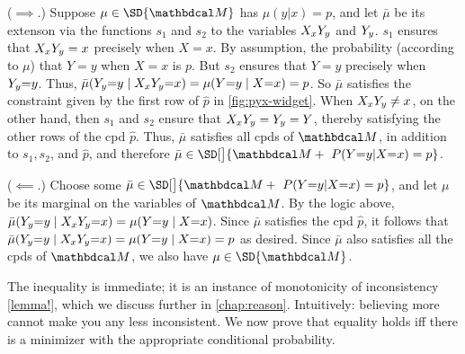 \begin{subappendices}
\begin{lproof}\label{proof:individual-prob-1}
    ($\implies$.)
    Suppose $\mu \in \SD{\dg M}$ has $\mu(y|x) = p$, and let $\bar\mu$ be its extenson via the functions $s_1$ and $s_2$ to the variables ${X_x Y_y}$ and ${Y_y}$. 
    $s_1$ ensures that ${X_x Y_y} = x$ precisely when $X = x$. 
    By assumption, the probability (according to $\mu$) that $Y{=}y$
    when $X{=}x$ is $p$. But $s_2$ ensures that $Y{=}y$ precisely when ${Y_y}{=}y$. 
    Thus,
    $\bar\mu({Y_y} {=} y \mid {X_x Y_y} {=} x) = \mu(Y{=}y \mid X{=}x) = p$.
    So $\bar \mu$ satisfies the constraint given by the first row of $\hat p$
        in \cref{fig:pyx-widget}.
    When ${X_x Y_y} \ne x$, on the other hand, then $s_1$ and $s_2$ ensure
    that ${X_x Y_y} = {Y_y} = Y$, thereby satisfying the other rows 
    of the cpd $\hat p$. 
    Thus, $\bar \mu$ satisfies all cpds of $\dg M$, in addition to $s_1, s_2$, and $\hat p$, and therefore $\bar\mu \in \SD[\big]{\dg M + ~\Pr(Y{=}y|X{=}x) = p}$.
    
    ($\impliedby$.)
    Choose some $\bar\mu \in \SD[\big]{\dg M + ~\Pr(Y{=}y|X{=}x) = p}$,
    and let $\mu$ be its marginal on the variables of $\dg M$. 
    By the logic above, $\bar\mu({Y_y} {=} y \mid {X_x Y_y} {=} x) = \mu(Y{=}y \mid X{=}x)$.
    Since $\bar\mu$ satisfies the cpd $\hat p$, it follows that $\bar\mu({Y_y} {=} y \mid {X_x Y_y} {=} x) = \mu(Y{=}y \mid X{=}x) = p$ as desired.
    Since $\bar\mu$ also satisfies all the cpds of $\dg M$, we also have $\mu \in \SD{\dg M}$.
\end{lproof}

\begin{lproof}  
        \label{proof:indiv-prob-inc-conditional}
    The inequality is immediate; it is an instance of monotonicity of inconsistency
    \cref{lemma!},
    which we discuss further in \cref{chap:reason}. Intuitively: believing more cannot make you any less
    inconsistent.  We now prove that equality holds iff there is a minimizer with the appropriate conditional probability.


\end{lproof}
\end{subappendices}
